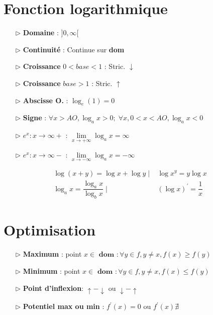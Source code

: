 \documentclass{report}
\begin{document}
\begin{multicols*}{3}
    \section{Fonction logarithmique}
    \begin{itemize}
        \item[$\rhd$]  \textbf{Domaine} : $]0, \infty [$  
        \item[$\rhd$]  \textbf{Continuité} : Continue sur \textbf{dom} 
        \item[$\rhd$]  \textbf{Croissance}  $0 < base < 1$ : 
            Stric. $\downarrow$

        \item[$\rhd$]  \textbf{Croissance}  $base > 1$ : Stric. $\uparrow$
        \item[$\rhd$]  \textbf{Abscisse O.} : $\log_e(1) = 0$ 
        \item[$\rhd$]  \textbf{Signe} : $\forall x > AO, \log_ax > 0; \; 
            \forall x, 0 < x < AO, \log_ax < 0$  
        \item[$\rhd$]   $e^x : x\longrightarrow\infty+$ :  
            $\lim\limits_{x\to+\infty}\log_ax  = \infty$  
            \item[$\rhd$]   $e^x : x\longrightarrow\infty-$ :  
                $\lim\limits_{x\to-\infty}\log_ax  = -\infty$
    \end{itemize}



    \begin{align*}
      \log(x+y) = \log x + \log y \; \Big| & \; \log x^y = y\log x \\
      \log_a x = \dfrac{\log_a x}{\log_b x} \; \Big| & \; 
                                     (\log x)^{\prime} = \dfrac{1}{x}  
    \end{align*}

    \section{Optimisation}

    \begin{itemize}
        \item[$\rhd$]  \textbf{Maximum} : point $x \in \textbf{ dom } : 
            \forall y \in f, y \neq x, f(x) \geq f(y)$     
        \item[$\rhd$]  \textbf{Minimum} : point $x \in \textbf{ dom } : 
            \forall y \in f, y \neq x, f(x) \leq f(y)$    
        \item[$\rhd$]  \textbf{Point d'inflexion}: $\uparrow - \downarrow$ 
            ou $\downarrow - \uparrow$
        \item[$\rhd$]  \textbf{Potentiel max ou min} :   
        $f^{\prime} \left( x \right) = 0$ ou 
        $f^{\prime} \left(x\right) \nexists$
    \end{itemize}


\end{multicols*}
\end{document}
